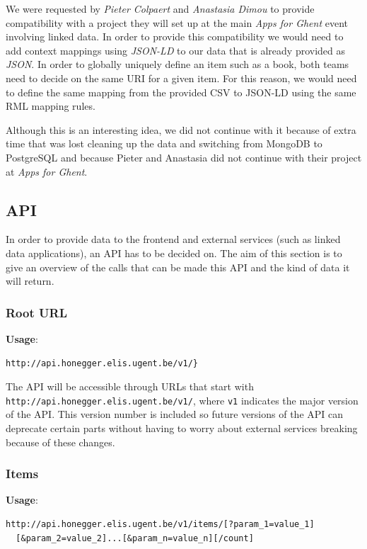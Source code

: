 We were requested by \emph{Pieter Colpaert} and \emph{Anastasia Dimou} to provide compatibility with a project they will set up at the main \emph{Apps for Ghent} event involving linked data. In order to provide this compatibility we would need to add context mappings using \emph{JSON-LD} to our data that is already provided as \emph{JSON}. In order to globally uniquely define an item such as a book, both teams need to decide on the same URI for a given item. For this reason, we would need to define the same mapping from the provided CSV to JSON-LD using the same RML mapping rules.

Although this is an interesting idea, we did not continue with it because of extra time that was lost cleaning up the data and switching from MongoDB to PostgreSQL and because Pieter and Anastasia did not continue with their project at \emph{Apps for Ghent}.

\subsection{API}

In order to provide data to the frontend and external services (such as linked data applications), an API has to be decided on. The aim of this section is to give an overview of the calls that can be made this API and the kind of data it will return.

\subsubsection{Root URL}

{\bf Usage}:
\begin{verbatim}
http://api.honegger.elis.ugent.be/v1/}
\end{verbatim}

The API will be accessible through URLs that start with \texttt{http://api.honegger.elis.ugent.be/v1/}, where \texttt{v1} indicates the major version of the API. This version number is included so future versions of the API can deprecate certain parts without having to worry about external services breaking because of these changes.

\subsubsection{Items}

{\bf Usage}:
\begin{verbatim}
http://api.honegger.elis.ugent.be/v1/items/[?param_1=value_1]
  [&param_2=value_2]...[&param_n=value_n][/count]
\end{verbatim}

